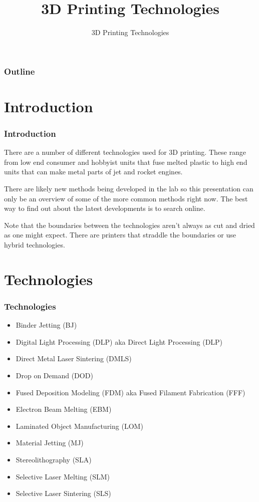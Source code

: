 \documentclass[english,10pt]{beamer}
\title{3D Printing Technologies}
\subtitle{3D Printing Technologies}
\begin{document}
\begin{frame}
  \titlepage
\end{frame}

\begin{frame}
  \frametitle{Outline}
  \tableofcontents
\end{frame}

\section{Introduction}
\begin{frame}
  \frametitle{Introduction}
  There are a number of different technologies used for 3D printing.  These range from low end consumer and hobbyist units that fuse melted plastic to high end units that can make metal parts of jet and rocket engines.

  There are likely new methods being developed in the lab so this presentation can only be an overview of some of the more common methods right now.  The best way to find out about the latest developments is to search online.  

  Note that the boundaries between the technologies aren't always as cut and dried as one might expect.  There are printers that straddle the boundaries or use hybrid technologies.
\end{frame}

\section{Technologies}
\begin{frame}
  \frametitle{Technologies}
  \begin{itemize}
    \item Binder Jetting (BJ)
    \item Digital Light Processing (DLP) aka Direct Light Processing (DLP)
    \item Direct Metal Laser Sintering (DMLS)
    \item Drop on Demand (DOD)
    \item Fused Deposition Modeling (FDM) aka Fused Filament Fabrication (FFF)
    \item Electron Beam Melting (EBM)
    \item Laminated Object Manufacturing (LOM)
    \item Material Jetting (MJ)
    \item Stereolithography (SLA)
    \item Selective Laser Melting (SLM)
    \item Selective Laser Sintering (SLS)
  \end{itemize}
\end{frame}
\end{document}
